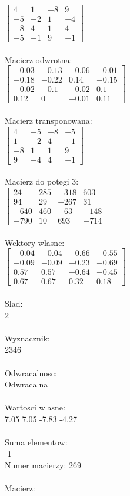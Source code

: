 \documentclass[a4paper,12pt]{article}
\begin{document}
$\begin{bmatrix} 4&1&-8&9\\-5&-2&1&-4\\-8&4&1&4\\-5&-1&9&-1 \end{bmatrix}$
\\
\\
Macierz odwrotna:\\

$\begin{bmatrix} -0.03&-0.13&-0.06&-0.01\\-0.18&-0.22&0.14&-0.15\\-0.02&-0.1&-0.02&0.1\\0.12&0&-0.01&0.11 \end{bmatrix}$
\\
\\
Macierz transponowana:\\

$\begin{bmatrix} 4&-5&-8&-5\\1&-2&4&-1\\-8&1&1&9\\9&-4&4&-1 \end{bmatrix}$
\\
\\
Macierz do potegi 3:\\

$\begin{bmatrix} 24&285&-318&603\\94&29&-267&31\\-640&460&-63&-148\\-790&10&693&-714 \end{bmatrix}$
\\
\\
Wektory wlasne:\\

$\begin{bmatrix} -0.04&-0.04&-0.66&-0.55\\-0.09&-0.09&-0.23&-0.69\\0.57&0.57&-0.64&-0.45\\0.67&0.67&0.32&0.18 \end{bmatrix}$
\\
\\
Slad:\\
2
\\
\\
Wyznacznik:\\
2346
\\
\\
Odwracalnosc:\\
Odwracalna
\\
\\
Wartosci wlasne:\\
7.05 7.05 -7.83 -4.27
\\
\\
Suma elementow:\\
-1
\\
\newpage
Numer macierzy:
269
\\
\\
Macierz:\\
\end{document}
